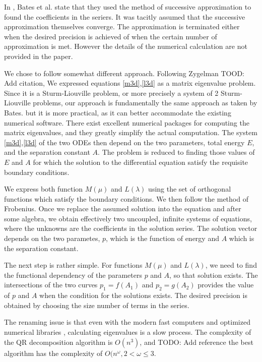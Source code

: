 In \cite{Bates1}, Bates et al. state that they used the method of successive approximation to found the coefficients in the seriers. It was tacitly assumed that the successive approximation themselves converge. The approximation is terminated either when the desired precision is achieved of when the certain number of approximation is met. However the details of the numerical calculation are not provided in the paper.

We chose to follow somewhat different approach. Following Zygelman TOOD: Add citation, We expressed equations \eqref{m3d},\eqref{l3d} as a matrix eigenvalue problem. Since it is a  Sturm-Liouville problem, or more precisely a system of 2 Sturm-Liouville problems, our approach is fundamentally the same approach as taken by Bates. but it is more practical, as it can better accommodate the existing numerical software. There exist excellent numerical packages \cite{Lapack1} for computing the matrix eigenvalues, and they greatly simplify the actual computation.
The system \eqref{m3d},\eqref{l3d} of the two ODEs then depend on the two parameters, total energy $ E $, and the separation constant $ A $. The problem is reduced to finding those values of $ E $ and $ A $ for which the solution to the differential equation satisfy the requisite boundary conditions. 

We express both function $ M(\mu) $ and $ L(\lambda) $ using the set of orthogonal functions which satisfy the boundary conditions. We then follow the method of Frobenius. Once we replace the assumed solution into the equation and after some algebra, we obtain effectively two uncoupled, infinite systems of equations, where the unknowns are the coefficients in the solution series. The solution vector depends on the two parametes, $ p $, which is the function of energy and $ A $ which is the separation constant. 

The next step is rather simple. For functions $ M(\mu) $ and $ L(\lambda) $, we need to find the functional dependency of the parameters $ p $ and $ A $, so that solution exists. The intersections of the two curves $ p_1 = f(A_1) $ and $ p_2 = g(A_2) $ provides the value of $ p $ and $ A $ when the condition for the  solutions exists. The desired precision is obtained by choosing the size number of terms in the series.

The renaming issue is that even with the modern fast computers and optimized numerical libraries \cite{Lapack1}, calculating eigenvalues is a slow process. The complexity of the QR decomposition algorithm is $ O(n^3) $, and TODO: Add reference the best algorithm has the complexity of $ O(n^{\omega}, 2 < \omega \le 3 $.

